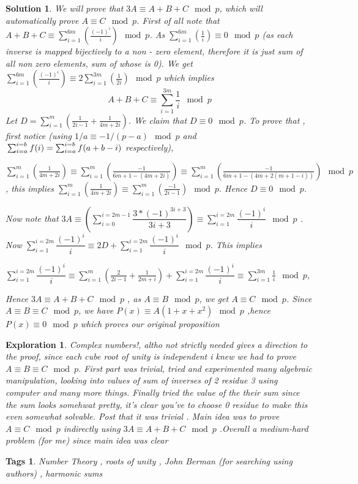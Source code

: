 \documentclass{article}
\newtheorem*{solution}{Solution}
\newtheorem*{exploration}{Exploration}
\newtheorem*{tags}{Tags}
\begin{document}
\begin{solution}
		We will prove that $3A \equiv A+B+C \mod p$, which will automatically prove $A\equiv C \mod p$. First of all note that $A+B+C \equiv \sum_{i=1}^{6m}(\frac{(-1)^i}{i}) \mod p$. As   
		\( \sum_{i=1}^{6m}(\frac{1}{i}) \equiv 0 \mod p \) (as each inverse is mapped bijectively to a non -  zero element, therefore it is just sum of all non zero elements, sum of whose is 0). 
		We get $\sum_{i=1}^{6m}(\frac{(-1)^i}{i}) \equiv 2\sum_{i=1}^{3m}(\frac{1}{2i}) \mod p$ which implies   
		 \[
		 A+B+C \equiv \sum_{i=1}^{3m}\frac{1}{i} \mod p
		 \]
		 Let $D= \sum_{i=1}^{m} \left( \frac{1}{2i-1} + \frac{1}{4m+2i}\right) $. We claim that $D \equiv 0 \mod p$. To prove that , first notice (using $1/a \equiv -1/(p-a) \mod p$ and  $\\ \sum_{i=a}^{i=b} f(i) = \sum_{i=a}^{i=b} f(a+b-i)$ respectively),
		 
		 $\sum_{i=1}^{m} \left( \frac{1}{4m+2i}\right) \equiv \sum_{i=1}^{m} \left( \frac{-1}{6m+1 - (4m+2i)}\right) \equiv \sum_{i=1}^{m} \left( \frac{-1}{6m+1 - (4m+2(m+1-i))}\right) \mod p $, this implies
		$ \sum_{i=1}^{m} \left( \frac{1}{4m+2i}\right) \equiv  \sum_{i=1}^{m} \left( \frac{-1}{2i-1}\right) \mod p $.
		Hence $D \equiv 0 \mod p$. 
		
		Now note that $3A \equiv \left(  \sum_{i=0}^{i=2m-1} \dfrac{3*(-1)^{3i+3} }{3i+3}\right) \equiv \sum_{i=1}^{i=2m} \dfrac{(-1)^i }{i}  \mod p$ .
		Now 
		$\sum_{i=1}^{i=2m} \dfrac{(-1)^i }{i}  \equiv 2D+\sum_{i=1}^{i=2m} \dfrac{(-1)^i }{i} \mod p $. This implies
		
		$\sum_{i=1}^{i=2m} \dfrac{(-1)^i }{i}  \equiv \sum_{i=1}^{m} \left( \frac{2}{2i-1} + \frac{1}{2m+i}\right)+\sum_{i=1}^{i=2m} \dfrac{(-1)^i }{i} \equiv \sum_{i=1}^{3m}\frac{1}{i} \mod p $, 
		
		Hence $3A \equiv A+B+C \mod p$ , as $A \equiv B \mod p$, we get $A \equiv C \mod p$. Since $A \equiv B \equiv C \mod p$, we have $P(x) \equiv A(1+x+x^2) \mod p$ ,hence $P(x) \equiv 0 \mod p$
		which proves our original proposition		
	\end{solution}
	
	\begin{exploration}
		Complex numbers!, altho not strictly needed gives a direction to the proof, since each cube root of unity is independent i knew we had to prove $A \equiv B \equiv C \mod p$. First part was trivial, tried and experimented many algebraic manipulation, looking into values of sum of inverses of 2 residue 3 using computer and many more things. Finally tried the value of the their sum since the sum looks somehwat pretty, it's clear you've to choose 0 residue to make this even somewhat solvable. Post that it was trivial . Main idea was to prove $A \equiv C \mod p$ indirectly using $3A \equiv A+B+C \mod p$ .Overall a medium-hard problem (for me) since main idea was clear
	\end{exploration}
	
	\begin{tags}
		Number Theory ,  roots of unity , John Berman (for searching using authors) , harmonic sums 
	\end{tags}
	
\end{document}
